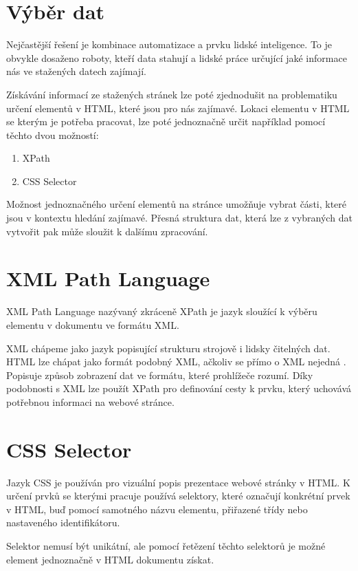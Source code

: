 \documentclass[thesis=B,czech]{FITthesis}[2012/06/26]
\begin{document}
\section{Výběr dat}
Nejčastější řešení je kombinace automatizace a prvku lidské inteligence.
To je obvykle dosaženo roboty, kteří data stahují a lidské práce určující jaké informace nás ve stažených datech zajímají.
\par
Získávání informací ze stažených stránek lze poté zjednodušit na problematiku určení elementů v HTML, které jsou pro 
nás zajímavé.
Lokaci elementu v HTML se kterým je potřeba pracovat, lze poté jednoznačně určit například pomocí těchto dvou možností:
\begin{enumerate}
\item XPath
\item CSS Selector
\end{enumerate}

Možnost jednoznačného určení elementů na stránce umožňuje vybrat části, které jsou v kontextu
hledání zajímavé.
Přesná struktura dat, která lze z vybraných dat vytvořit pak může sloužit k dalšímu zpracování.

\section{XML Path Language}
XML Path Language\cite{XPath} nazývaný zkráceně XPath je jazyk sloužící k výběru elementu v dokumentu ve formátu XML\cite{XML}.
\par
XML chápeme jako jazyk popisující strukturu strojově i lidsky čitelných dat.
HTML lze chápat jako formát podobný XML, ačkoliv se přímo o XML nejedná \cite{HTML}. 
Popisuje způsob zobrazení dat ve formátu, které prohlížeče rozumí.
Díky podobnosti s XML lze použít XPath pro definování cesty k prvku, který uchovává potřebnou informaci na webové stránce.
\par
\section{CSS Selector}
Jazyk CSS je používán pro vizuální popis prezentace webové stránky v HTML. K určení prvků se kterými
pracuje používá selektory, které označují konkrétní prvek v HTML, buď pomocí samotného názvu elementu, přiřazené třídy nebo nastaveného
identifikátoru.\cite{CSS}
\par
Selektor nemusí být unikátní, ale pomocí řetězení těchto selektorů je možné element jednoznačně v HTML dokumentu získat.
\end{document}
